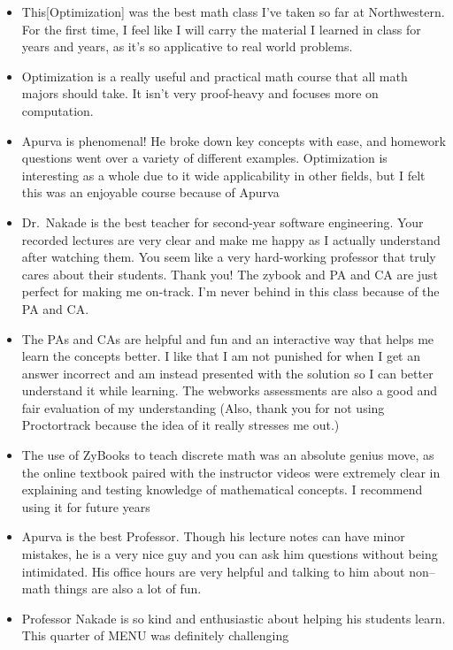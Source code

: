 \documentclass[
]{report}
\providecommand{\tightlist}{%
  \setlength{\itemsep}{0pt}\setlength{\parskip}{0pt}}
\begin{document}
\begin{itemize}
\tightlist
\item
  This{[}Optimization{]} was the best math class I've taken so far at Northwestern. For the first time, I feel like I will carry the material I learned in class
  for years and years, as it's so applicative to real world problems.
\item
  Optimization is a really useful and practical math course that all math majors should take. It isn't very proof-heavy and focuses
  more on computation.\\
\item
  Apurva is phenomenal! He broke down key concepts with ease, and homework questions went over a variety of different examples.
  Optimization is interesting as a whole due to it wide applicability in other fields, but I felt this was an enjoyable course because of
  Apurva
\item
  Dr.~Nakade is the best teacher for second-year software engineering. Your recorded lectures are very clear and make me happy as I
  actually understand after watching them. You seem like a very hard-working professor that truly cares about their students. Thank you!
  The zybook and PA and CA are just perfect for making me on-track. I'm never behind in this class because of the PA and CA.
\item
  The PAs and CAs are helpful and
  fun and an interactive way that helps me learn the concepts better. I like that I am not punished for when I get an answer incorrect and
  am instead presented with the solution so I can better understand it while learning. The webworks assessments are also a good and
  fair evaluation of my understanding
  (Also, thank you for not using Proctortrack because the idea of it really stresses me out.)
\item
  The use of ZyBooks to teach discrete math was an absolute genius move, as the online textbook paired with the instructor videos were
  extremely clear in explaining and testing knowledge of mathematical concepts. I recommend using it for future years
\item
  Apurva is the best Professor. Though his lecture notes can have minor mistakes, he is a very nice guy and you can ask him
  questions without being intimidated. His office hours are very helpful and talking to him about non--math things are also a lot of fun.
\item
  Professor Nakade is so kind and enthusiastic about helping his students learn. This quarter of MENU was definitely challenging

\end{itemize}
\end{document}
